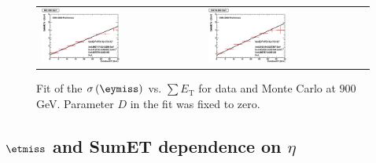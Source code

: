 \begin{figure}[h!]
 \centering
 \begin{tabular}{ll}
  \includegraphics[width=0.5\textwidth]{plots_DataVsMC_MB_900GeV/final_metysigma_sumet_MC_900.eps} &
  \includegraphics[width=0.5\textwidth]{plots_DataVsMC_MB_900GeV/final_metysigma_sumet_DATA_900.eps} \\
 \end{tabular}
 \caption{\small Fit of the $\sigma\left(\eymiss\right)$ vs. $\sum E_\text{T}$ for data and Monte Carlo at $900$ GeV. Parameter $D$ in the fit was fixed
          to zero.\label{fig:MEySigma_vs_SumET_900_fit}}
\end{figure}

\clearpage

\subsection{$\etmiss$ and SumET dependence on $\eta$}

